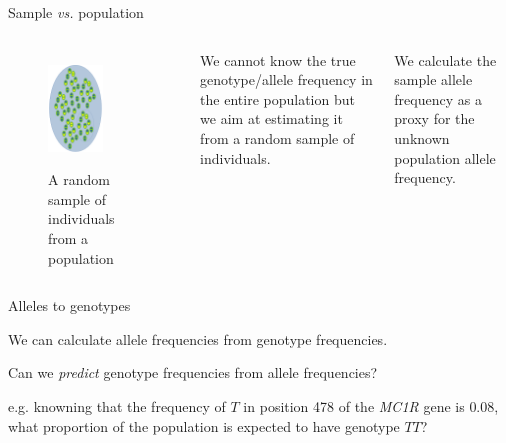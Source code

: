 \begin{frame}{Sample \textit{vs.} population}

	\begin{columns}


                \begin{figure}
                        \includegraphics[width=0.6\textwidth]{Pics/sample} \
			 \caption{A random sample of individuals from a population}
                \end{figure}


		\small
		We cannot know the true genotype/allele frequency in the entire population 
		but we aim at estimating it from a random sample of individuals.
		\bigskip
		\begin{block}{}
			We calculate the sample allele frequency as a proxy for the unknown population allele frequency.
		\end{block}

	\end{columns}

\end{frame}


\begin{frame}{Alleles to genotypes}

	We can calculate allele frequencies from genotype frequencies.
	\begin{block}{}
		Can we \textit{predict} genotype frequencies from allele frequencies?
	\end{block}

	e.g. knowning that the frequency of $T$ in position 478 of the \textit{MC1R} gene is $0.08$, 
	what proportion of the population is expected to have genotype $TT$?

\end{frame}


